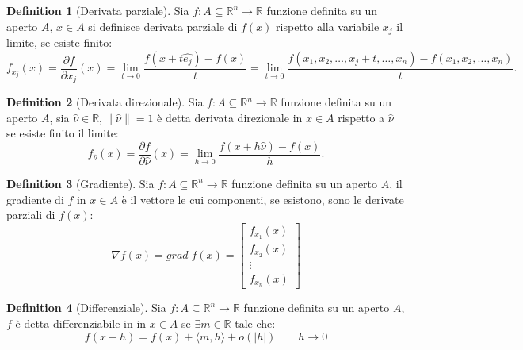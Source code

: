 \documentclass[leqno]{article}
\theoremstyle{definition}
\newtheorem{definition}{Definition}[section]
\numberwithin{equation}{section}
\theoremstyle{remark}
\begin{document}
	\begin{definition}[Derivata parziale]
		Sia $f:A\subseteq \mathbb{R}^n \rightarrow \mathbb{R}$ funzione definita su un aperto $A$, $ {x} \in A$ si definisce derivata parziale di $f(x)$ rispetto alla variabile $x_j$ il limite, se esiste finito: 
		\begin{equation}
			f_{x_j}(x)={\frac {\partial f}{\partial x_{j}}}(  {x} )=\lim _{t\to 0}{\frac {f(  {x} +t  \hat{e_{j}})-f(  {x} )}{t}}=\lim _{t\to 0}{\frac {f(x_{1},x_{2},\dots, x_{j}+t,\dots ,x_{n})-f(x_{1},x_{2},\dots ,x_{n})}{t}}.
		\end{equation}
	\end{definition}
	\begin{definition}[Derivata direzionale]
		Sia $f:A\subseteq \mathbb{R}^n \rightarrow \mathbb{R}$ funzione definita su un aperto $A$, sia $\hat{\nu} \in \mathbb{R}, \lVert \hat{\nu} \rVert = 1$ è detta derivata direzionale in $ {x} \in A$ rispetto a $\hat{\nu}$ se esiste finito il limite:
		\begin{equation}
			f_{\hat{\nu}}(x)={\frac {\partial f}{\partial \hat{\nu}}(  {x} )=\lim _{h\rightarrow 0}{\frac {f( x +h  \hat{\nu} )-f( {x} )}{h}}.}
		\end{equation}
	\end{definition}
	\begin{definition}[Gradiente]
		Sia $f:A\subseteq \mathbb{R}^n \rightarrow \mathbb{R}$ funzione definita su un aperto $A$, il gradiente di $f$ in $ {x} \in A$ è il vettore le cui componenti, se esistono, sono le derivate parziali di $f(x)$:
		\begin{equation}
			\nabla f(x) =grad \; f(x) = \begin{bmatrix}
				f_{x_1}(x)\\ f_{x_2}(x)\\\vdots \\f_{x_n}(x)
			\end{bmatrix}
		\end{equation}
	\end{definition}
	\begin{definition}[Differenziale]
		Sia $f:A\subseteq \mathbb{R}^n \rightarrow \mathbb{R}$ funzione definita su un aperto $A$, $f$ è detta differenziabile in in $ {x} \in A$ se $\exists m \in \mathbb{R}$ tale che: 
		\begin{equation}
			f(x+h)=f(x)+\langle m , h \rangle + o(|h|) \quad \quad h\rightarrow 0
		\end{equation}
	\end{definition}
	
\end{document}
